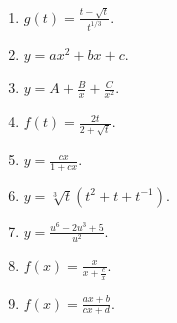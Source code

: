 \begin{problem}
\begin{multicols}{2}
\begin{enumerate}
\item $g(t)=\frac{t-\sqrt{t}}{t^{1/3}}$.

\item $y=a x^2+b x + c$.

\item $y=A+\frac{B}x +\frac{C}{x^2}$.

\item $f(t)=\frac{2t}{2+\sqrt{t}}$.

\item $y=\frac{c x}{1+c x}$.

\item $y=\sqrt[3]{t}(t^2+t+t^{-1}) $.

\item $y=\frac{u^6-2u^3+5}{u^2}$.

\item $f(x)=\frac{x}{x+\frac{c}{x}}$.

\item $f(x)=\frac{a x+b}{c x+ d}$.

\end{enumerate}
\end{multicols}
\end{problem}